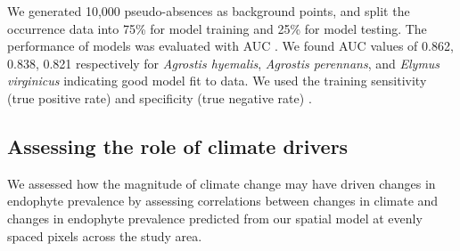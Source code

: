 \documentclass[11pt]{article}
\newcommand{\josh}[2]{{\color{orange}{#1}}\footnote{\textit{\color{orange}{#2}}}}
\newcommand{\firstrevise}[1]{{\color{black}{#1}}}
\begin{document}
We generated 10,000 pseudo-absences as background points, and split the occurrence data into 75\% for model training and 25\% for model testing.
The performance of models was evaluated with AUC \citep{jimenez2012insights}. 
We found AUC values of 0.862, 0.838, 0.821 respectively  for \emph{Agrostis hyemalis}, \emph{Agrostis perennans}, and \emph{Elymus virginicus} indicating good model fit to data.
We used the training sensitivity (true positive rate) and specificity (true negative rate) \firstrevise{to set a threshold for transforming the continuous predicted probabilities into binary presence - absence host distribution maps on which we projected INLA predictions of endophyte prevalence} \citep{liu2005selecting}.


\subsection*{Assessing the role of climate drivers}
We assessed how the magnitude of climate change may have driven changes in endophyte prevalence by assessing correlations between changes in climate and changes in endophyte prevalence predicted from our spatial model at evenly spaced pixels across the study area.
\end{document}
